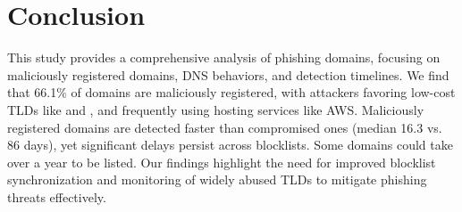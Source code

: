 \section{Conclusion}
This study provides a comprehensive analysis of phishing domains, focusing on maliciously registered domains, DNS behaviors, and detection timelines. We find that 66.1\% of domains are maliciously registered, with attackers favoring low-cost TLDs like  and , and frequently using hosting services like AWS. 
Maliciously registered domains are detected faster than compromised ones (median 16.3 vs. 86 days), yet significant delays persist across blocklists. 
Some domains could take over a year to be listed. 
Our findings highlight the need for improved blocklist synchronization and monitoring of widely abused TLDs to mitigate phishing threats effectively. 
\label{sec:conclusion}